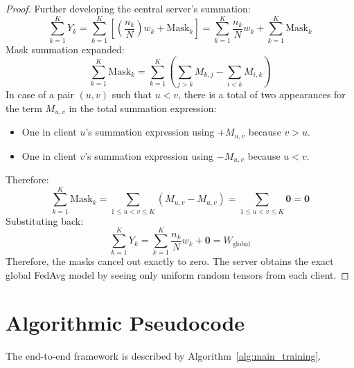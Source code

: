 \documentclass[12pt,a4paper]{report}
\begin{document}
\begin{proof}
Further developing the central server’s summation:
\begin{equation}
    \sum_{k=1}^K Y_k = \sum_{k=1}^K \left[ \left(\frac{n_k}{N}\right) w_k + \text{Mask}_k \right] = \sum_{k=1}^K \frac{n_k}{N} w_k + \sum_{k=1}^K \text{Mask}_k
\end{equation}
Mask summation expanded:
\begin{equation}
    \sum_{k=1}^K \text{Mask}_k = \sum_{k=1}^K \left( \sum_{j > k} M_{k,j} - \sum_{i < k} M_{i,k} \right)
\end{equation}
In case of a pair $(u, v)$ such that $u < v$, there is a total of two appearances for the term $M_{u,v}$ in the total summation expression:
\begin{itemize}
    \item One in client $u$'s summation expression using $+M_{u,v}$ because $v > u$.
    \item One in client $v$'s summation expression using $-M_{u,v}$ because $u < v$.
\end{itemize}
Therefore:
\begin{equation}
    \sum_{k=1}^K \text{Mask}_k = \sum_{1 \le u < v \le K} (M_{u,v} - M_{u,v}) = \sum_{1 \le u < v \le K} \mathbf{0} = \mathbf{0}
\end{equation}
Substituting back:
\begin{equation}
    \sum_{k=1}^K Y_k = \sum_{k=1}^K \frac{n_k}{N} w_k + \mathbf{0} = W_{\text{global}}
\end{equation}
Therefore, the masks cancel out exactly to zero. The server obtains the exact global FedAvg model by seeing only uniform random tensors from each client.
\end{proof}

\section{Algorithmic Pseudocode}
The end-to-end framework is described by Algorithm~\ref{alg:main_training}.
\end{document}

